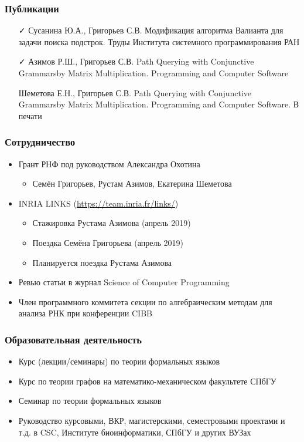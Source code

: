 \documentclass[xcolor=table]{beamer}
\begin{document}
\begin{frame}[fragile]

  \frametitle{Публикации}
\begin{itemize}
      \item[\faCheck] Сусанина Ю.А., Григорьев С.В. Модификация алгоритма Валианта для задачи поиска подстрок. Труды Института системного программирования РАН
      \item[\faCheck] Азимов Р.Ш., Григорьев С.В. Path Querying with Conjunctive Grammarsby Matrix Multiplication. Programming and Computer Software
      \item[\faHourglassHalf] Шеметова Е.Н., Григорьев С.В. Path Querying with Conjunctive Grammarsby Matrix Multiplication. Programming and Computer Software. В печати
\end{itemize}
\end{frame}

\begin{frame}[fragile]

  \frametitle{Сотрудничество}
\begin{itemize}
      \item Грант РНФ под руководством Александра Охотина
      \begin{itemize}
        \item Семён Григорьев, Рустам Азимов, Екатерина Шеметова
      \end{itemize}
      \item INRIA LINKS (\url{https://team.inria.fr/links/})
      \begin{itemize}
         \item Стажировка Рустама Азимова (апрель 2019)
         \item Поездка Семёна Григорьева (апрель 2019)
         \item Планируется поездка Рустама Азимова
      \end{itemize}
      \pause
      \item Ревью статьи в журнал Science of Computer Programming
      \item Член программного коммитета секции по алгебраическим методам для анализа РНК при конференции CIBB

\end{itemize}
\end{frame}

\begin{frame}[fragile]

  \frametitle{Образовательная деятельность}
\begin{itemize}
      \item Курс (лекции/семинары) по теории формальных языков
      \item Курс по теории графов на математико-механическом факультете СПбГУ
      \item Семинар по теории формальных языков
      \item Руководство курсовыми, ВКР, магистерскими, семестровыми проектами и т.д. в CSC, Институте биоинформатики, СПбГУ и других ВУЗах
\end{itemize}
\end{frame}
\end{document}
